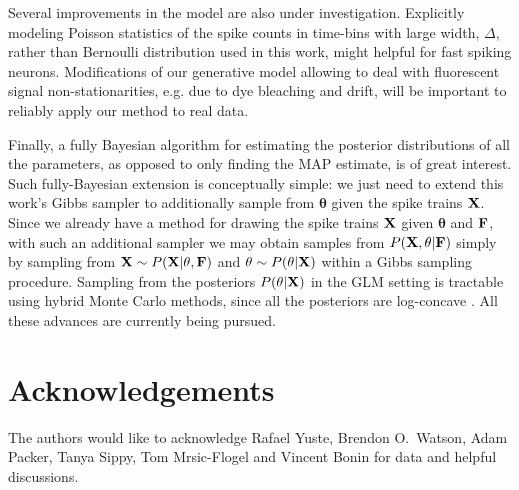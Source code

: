 \documentclass[aoas,preprint]{imsart}
\newcommand{\bth}{\mathbf{\theta}}
\newcommand{\bF}{{\bf F}}
\newcommand{\bX}{{\bf X}}
\begin{document}
Several improvements in the model are also under investigation.  Explicitly modeling Poisson statistics of the spike counts in time-bins with large width, $\Delta$, rather than Bernoulli distribution used in this work, might helpful for fast spiking neurons. Modifications of our generative model allowing to deal with fluorescent signal non-stationarities, e.g. due to dye bleaching and drift, will be important to reliably apply our method to real data. 

Finally, a fully Bayesian algorithm for estimating the posterior distributions of all the parameters, as opposed to only finding the MAP estimate, is of great interest. Such fully-Bayesian extension is conceptually simple: we just need to extend this work's Gibbs sampler to additionally sample from $\bth$ given the spike trains $\bX$. Since we already have a method for drawing the spike trains $\bX$ given $\bth$ and $\bF$, with such an additional sampler we may obtain samples from $P(\bX,\bth | \bF)$ simply by sampling from $\bX \sim P(\bX|\theta,\bF)$ and $\bth \sim P(\bth |\bX)$ within a Gibbs sampling procedure.  Sampling from the posteriors $P(\bth|\bX)$ in the GLM setting is tractable using hybrid Monte Carlo methods, since all the posteriors are log-concave \cite{Ishwaran99,Gamerman97,Gamerman98,Yashar08}.  All these advances are currently being pursued.

\section*{Acknowledgements}
The authors would like to acknowledge Rafael Yuste, Brendon O.\ Watson, Adam Packer, Tanya Sippy, Tom Mrsic-Flogel and Vincent Bonin for data and helpful discussions.


% 

\end{document}
